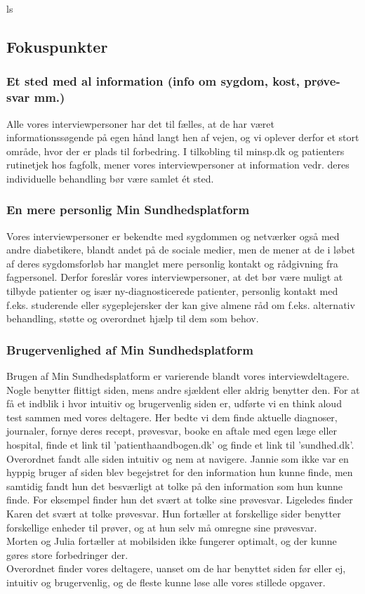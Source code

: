 ls
\subsection{Fokuspunkter}
\subsubsection{Et sted med al information (info om sygdom, kost, prøve-svar mm.)}
Alle vores interviewpersoner har det til fælles, at de har været informationssøgende på egen hånd langt hen af vejen, og vi oplever derfor et stort område, hvor der er plads til forbedring. I tilkobling til minsp.dk og patienters rutinetjek hos fagfolk, mener vores interviewpersoner at information vedr. deres individuelle behandling bør være samlet ét sted.

\subsubsection{En mere personlig Min Sundhedsplatform}
Vores interviewpersoner er bekendte med sygdommen og netværker også med andre diabetikere, blandt andet på de sociale medier, men de mener at de i løbet af deres sygdomsforløb har manglet mere personlig kontakt og rådgivning fra fagpersonel. Derfor foreslår vores interviewpersoner, at det bør være muligt at tilbyde patienter og især ny-diagnosticerede patienter, personlig kontakt med f.eks. studerende eller sygeplejersker der kan give almene råd om f.eks. alternativ behandling, støtte og overordnet hjælp til dem som behov.

\subsubsection{Brugervenlighed af Min Sundhedsplatform}
Brugen af Min Sundhedsplatform er varierende blandt vores interviewdeltagere. Nogle benytter flittigt siden, mens andre sjældent eller aldrig benytter den. For at få et indblik i hvor intuitiv og brugervenlig siden er, udførte vi en think aloud test sammen med vores deltagere. Her bedte vi dem finde aktuelle diagnoser, journaler, fornye deres recept, prøvesvar, booke en aftale med egen læge eller hospital, finde et link til 'patienthaandbogen.dk' og finde et link til 'sundhed.dk'. Overordnet fandt alle siden intuitiv og nem at navigere. Jannie som ikke var en hyppig bruger af siden blev begejstret for den information hun kunne finde, men samtidig fandt hun det besværligt at tolke på den information som hun kunne finde. For eksempel finder hun det svært at tolke sine prøvesvar. Ligeledes finder Karen det svært at tolke prøvesvar. Hun fortæller at forskellige sider benytter forskellige enheder til prøver, og at hun selv må omregne sine prøvesvar.\\
Morten og Julia fortæller at mobilsiden ikke fungerer optimalt, og der kunne gøres store forbedringer der.\\
Overordnet finder vores deltagere, uanset om de har benyttet siden før eller ej, intuitiv og brugervenlig, og de fleste kunne løse alle vores stillede opgaver.

